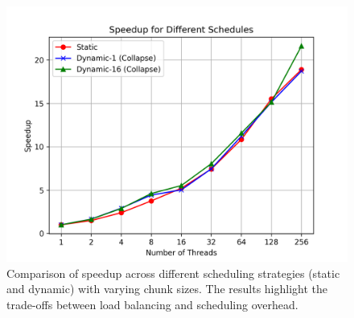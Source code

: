 \begin{figure}[htbp]
    \centering
    \includegraphics[width=1.0\linewidth]{images/load_imbalance_speedup_comparison.png}
    \caption{Comparison of speedup across different scheduling strategies (static and dynamic) with varying chunk sizes. The results highlight the trade-offs between load balancing and scheduling overhead.}
    \label{fig:load-imbalance-speedup}
\end{figure}